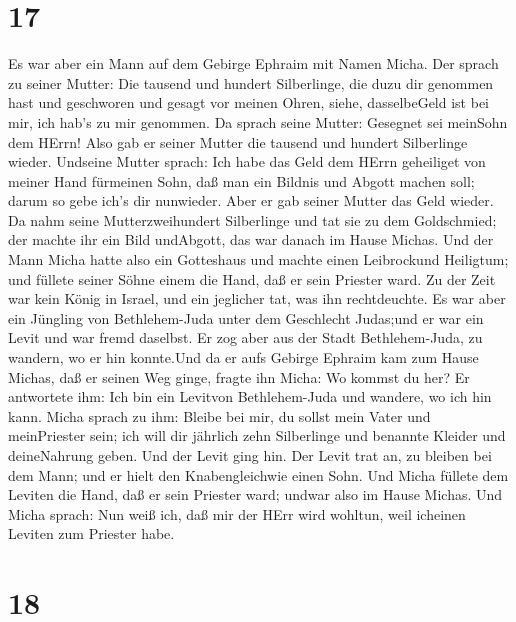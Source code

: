 \hypertarget{section-16}{%
\section{17}\label{section-16}}

 Es war aber ein Mann auf dem Gebirge Ephraim mit Namen
Micha.  Der sprach zu seiner Mutter: Die tausend und hundert
Silberlinge, die duzu dir genommen hast und geschworen und gesagt vor
meinen Ohren, siehe, dasselbeGeld ist bei mir, ich hab's zu mir
genommen. Da sprach seine Mutter: Gesegnet sei meinSohn dem HErrn!
 Also gab er seiner Mutter die tausend und hundert
Silberlinge wieder. Undseine Mutter sprach: Ich habe das Geld dem HErrn
geheiliget von meiner Hand fürmeinen Sohn, daß man ein Bildnis und
Abgott machen soll; darum so gebe ich's dir nunwieder.  Aber
er gab seiner Mutter das Geld wieder. Da nahm seine Mutterzweihundert
Silberlinge und tat sie zu dem Goldschmied; der machte ihr ein Bild
undAbgott, das war danach im Hause Michas.  Und der Mann
Micha hatte also ein Gotteshaus und machte einen Leibrockund Heiligtum;
und füllete seiner Söhne einem die Hand, daß er sein Priester ward.
 Zu der Zeit war kein König in Israel, und ein jeglicher
tat, was ihn rechtdeuchte.  Es war aber ein Jüngling von
Bethlehem-Juda unter dem Geschlecht Judas;und er war ein Levit und war
fremd daselbst.  Er zog aber aus der Stadt Bethlehem-Juda,
zu wandern, wo er hin konnte.Und da er aufs Gebirge Ephraim kam zum
Hause Michas, daß er seinen Weg ginge,  fragte ihn Micha: Wo
kommst du her? Er antwortete ihm: Ich bin ein Levitvon Bethlehem-Juda
und wandere, wo ich hin kann.  Micha sprach zu ihm: Bleibe
bei mir, du sollst mein Vater und meinPriester sein; ich will dir
jährlich zehn Silberlinge und benannte Kleider und deineNahrung geben.
Und der Levit ging hin.  Der Levit trat an, zu bleiben bei
dem Mann; und er hielt den Knabengleichwie einen Sohn.  Und
Micha füllete dem Leviten die Hand, daß er sein Priester ward; undwar
also im Hause Michas.  Und Micha sprach: Nun weiß ich, daß
mir der HErr wird wohltun, weil icheinen Leviten zum Priester habe.

\hypertarget{section-17}{%
\section{18}\label{section-17}}

